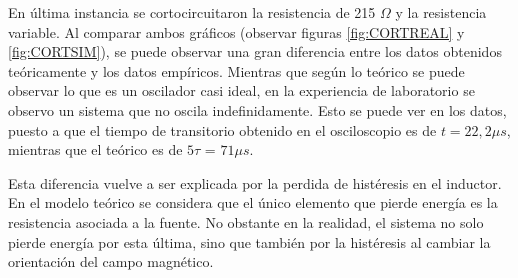 \documentclass{article}
\begin{document}
  En última instancia se cortocircuitaron la resistencia de 215 $\Omega$ y la resistencia variable. Al comparar ambos gráficos (observar figuras \ref{fig:CORTREAL} y \ref{fig:CORTSIM}), se puede observar una gran diferencia entre los datos obtenidos teóricamente y los datos empíricos. Mientras que según lo teórico se puede observar lo que es un oscilador casi ideal, en la experiencia de laboratorio se observo un sistema que no oscila indefinidamente. Esto se puede ver en los datos, puesto a que el tiempo de transitorio obtenido en el osciloscopio es de $ t = 22,2 \mu s$, mientras que el teórico es de $5\tau$ = $71 \mu s$.\par
  Esta diferencia vuelve a ser explicada por la perdida de histéresis en el inductor. En el modelo teórico se considera que el único elemento que pierde energía es la resistencia asociada a la fuente. No obstante en la realidad, el sistema no solo pierde energía por esta última, sino que también por la histéresis al cambiar la orientación del campo magnético.
  
\end{document}
